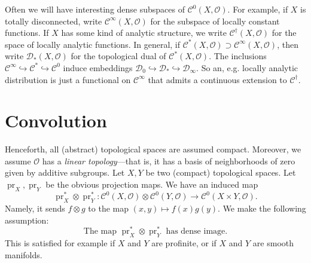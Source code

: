 \documentclass{article}
\DeclareMathOperator{\pr}{pr}
\newcommand{\cO}{\mathcal{O}}
\newcommand{\sC}{\mathscr{C}}
\newcommand{\sD}{\mathscr{D}}
\theoremstyle{definition}
\begin{document}
Often we will have interesting dense subspaces of $\sC^0(X,\cO)$. For example, 
if $X$ is totally disconnected, write $\sC^\infty(X,\cO)$ for the subspace of 
locally constant functions. If $X$ has some kind of analytic structure, we 
write $\sC^\dagger(X,\cO)$ for the space of locally analytic functions. In 
general, if $\sC^\ast(X,\cO)\supset \sC^\infty(X,\cO)$, then write 
$\sD_\ast(X,\cO)$ for the topological dual of $\sC^\ast(X,\cO)$. The inclusions 
$\sC^\infty\hookrightarrow \sC^\ast\hookrightarrow \sC^0$ induce embeddings 
$\sD_0\hookrightarrow \sD_\ast\hookrightarrow \sD_\infty$. So an, e.g. locally 
analytic distribution is just a functional on $\sC^\infty$ that admits a 
continuous extension to $\sC^\dagger$. 





\section{Convolution}

Henceforth, all (abstract) topological spaces are assumed compact. Moreover, we 
assume $\cO$ has a \emph{linear topology}---that is, it has a basis of 
neighborhoods of zero given by additive subgroups. Let $X,Y$ be 
two (compact) topological spaces. Let $\pr_X,\pr_Y$ be the obvious projection 
maps. We have an induced map 
\[
  \pr_X^\ast\otimes \pr_Y^\ast\colon \sC^0(X,\cO)\otimes \sC^0(Y,\cO)\to \sC^0(X\times Y,\cO) .
\]
Namely, it sends $f\otimes g$ to the map $(x,y)\mapsto f(x) g(y)$. We make the 
following assumption:
\begin{equation*}\tag{dense}\label{assumption}
\text{The map $\pr_X^\ast\otimes \pr_Y^\ast$ has dense image.}
\end{equation*}
This is satisfied for example if $X$ and $Y$ are profinite, or if $X$ and $Y$ 
are smooth manifolds. 
\end{document}
